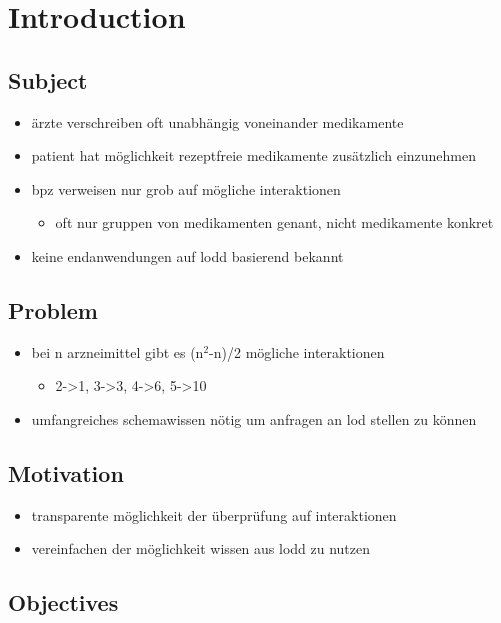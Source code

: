 \chapter{Introduction}
\label{cha:introduction-1}

\section{Subject}
\label{sec-1}

\begin{itemize}
\item ärzte verschreiben oft unabhängig voneinander medikamente
\item patient hat möglichkeit rezeptfreie medikamente zusätzlich einzunehmen
\item bpz verweisen nur grob auf mögliche interaktionen
\begin{itemize}
\item oft nur gruppen von medikamenten genant, nicht medikamente konkret
\end{itemize}
\item keine endanwendungen auf lodd basierend bekannt
\end{itemize}
\section{Problem}
\label{sec-2}

\begin{itemize}
\item bei n arzneimittel gibt es (n$^2$-n)/2 mögliche interaktionen
\begin{itemize}
\item 2->1, 3->3, 4->6, 5->10
\end{itemize}
\item umfangreiches schemawissen nötig um anfragen an lod stellen zu können
\end{itemize}
\section{Motivation}
\label{sec-3}

\begin{itemize}
\item transparente möglichkeit der überprüfung auf interaktionen
\item vereinfachen der möglichkeit wissen aus lodd zu nutzen
\end{itemize}
\section{Objectives}
\label{sec-4}

